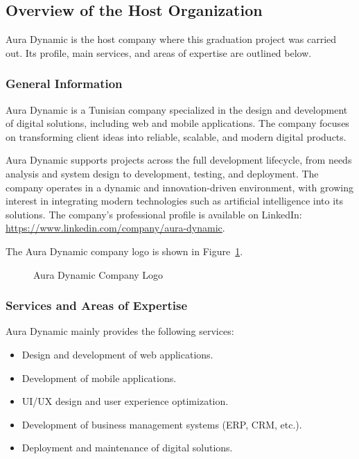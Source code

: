 	\subsection{Overview of the Host Organization}
	
	Aura Dynamic is the host company where this graduation project was carried out. Its profile, main
	services, and areas of expertise are outlined below.
	
	\subsubsection{General Information}
	
	Aura Dynamic is a Tunisian company specialized in the design and development of digital
	solutions, including web and mobile applications. The company focuses on transforming
	client ideas into reliable, scalable, and modern digital products.
	
	Aura Dynamic supports projects across the full development lifecycle, from needs analysis
	and system design to development, testing, and deployment. The company operates in a
	dynamic and innovation-driven environment, with growing interest in integrating modern
	technologies such as artificial intelligence into its solutions.
	The company's professional profile is available on LinkedIn: \url{https://www.linkedin.com/company/aura-dynamic}.
	
	The Aura Dynamic company logo is shown in Figure~\ref{fig:aura_logo}.
	
	\begin{figure}[H]
	  \centering
	  \caption{Aura Dynamic Company Logo}
	  \label{fig:aura_logo}
	\end{figure}
	\subsubsection{Services and Areas of Expertise}
	
	Aura Dynamic mainly provides the following services:
	
	\begin{itemize}
	  \item Design and development of web applications.
	  \item Development of mobile applications.
	  \item UI/UX design and user experience optimization.
	  \item Development of business management systems (ERP, CRM, etc.).
	  \item Deployment and maintenance of digital solutions.
	\end{itemize}
	
